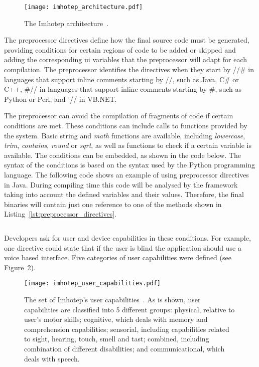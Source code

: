 \begin{figure}[H]
\centering
\texttt{[image: imhotep\_architecture.pdf]}
\caption{The Imhotep architecture~\citep{imhotep_website}.}
\label{fig:imhotep_architecture}
\end{figure}

The preprocessor directives define how the final source code must be generated, 
providing conditions for certain regions of code to be added or skipped and 
adding the corresponding \ac{ui} variables that the preprocessor will adapt for each
compilation. The preprocessor identifies the directives when they start by //\#
in languages that support inline comments starting by //, such as Java, C\# or
C++, \#// in languages that support inline comments starting by \#, such as 
Python or Perl, and '// in VB.NET.

The preprocessor can avoid the compilation of fragments of code if certain 
conditions are met. These conditions can include calls to functions provided 
by the system. Basic string and \textit{math} functions are available, including
\textit{lowercase}, \textit{trim}, \textit{contains}, \textit{round} or 
\textit{sqrt}, as well as functions to check if a certain variable is 
available. The conditions can be embedded, as shown in the code below. The 
syntax of the conditions is  based on the syntax used by the Python programming 
language. The following code shows an example of using preprocessor directives 
in Java. During compiling time this code will be analysed by the framework 
taking into account the defined variables and their values. Therefore, the final 
binaries will contain just one reference to one of the methods shown in 
Listing~\ref{lst:preprocessor_directives}.


\inputminted[linenos=true, fontsize=\footnotesize, frame=lines]{python}{5_experiments_and_results/preprocessor_directives.py}


Developers ask for user and device capabilities in these conditions. For 
example, one directive could state that if the user is blind the application 
should use a voice based interface. Five categories of user capabilities were 
defined (see Figure~\ref{fig:imhotep_user_capabilities}).


\begin{figure}[H]
\centering
\texttt{[image: imhotep\_user\_capabilities.pdf]}
\caption{The set of Imhotep's user capabilities~\citep{imhotep_website}. As is
shown, user capabilities are classified into 5 different groups: physical, 
relative to user's motor skills; cognitive, which deals with memory and 
comprehension capabilities; sensorial, including capabilities related to 
sight, hearing, touch, smell and tast; combined, including combination of 
different disabilities; and communicational, which deals with speech.}
\label{fig:imhotep_user_capabilities}
\end{figure}

